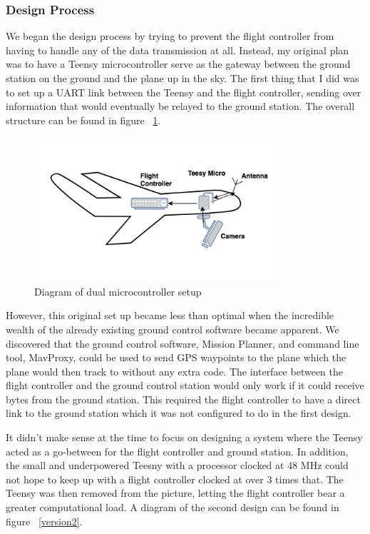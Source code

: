 \documentclass[12pt,journal,compsoc]{IEEEtran}
\begin{document}
\subsubsection{Design Process}
We began the design process by trying to prevent the flight controller from having to handle any of the data transmission at all. Instead, my original plan was to have a Teensy microcontroller serve as the gateway between the ground station on the ground and the plane up in the sky. The first thing that I did was to set up a UART link between the Teensy and the flight controller, sending over information that would eventually be relayed to the ground station. The overall structure can be found in figure ~\ref{version1}.
\begin{figure}[h!]
\hspace*{0cm}
\centering
\includegraphics[width=3.5in]{Version1.png}
\caption{Diagram of dual microcontroller setup}
\label{version1}
\end{figure}

However, this original set up became less than optimal when the incredible wealth of the already existing ground control software became apparent. We discovered that the ground control software, Mission Planner, and command line tool, MavProxy, could be used to send GPS waypoints to the plane which the plane would then track to without any extra code. The interface between the flight controller and the ground control station would only work if it could receive bytes from the ground station. This required the flight controller to have a direct link to the ground station which it was not configured to do in the first design. 

It didn't make sense at the time to focus on designing a system where the Teensy acted as a go-between for the flight controller and ground station. In addition, the small and underpowered Teesny with a processor clocked at 48 MHz could not hope to keep up with a flight controller clocked at over 3 times that. The Teensy was then removed from the picture, letting the flight controller bear a greater computational load. A diagram of the second design can be found in figure ~\ref{version2}.
\end{document}
